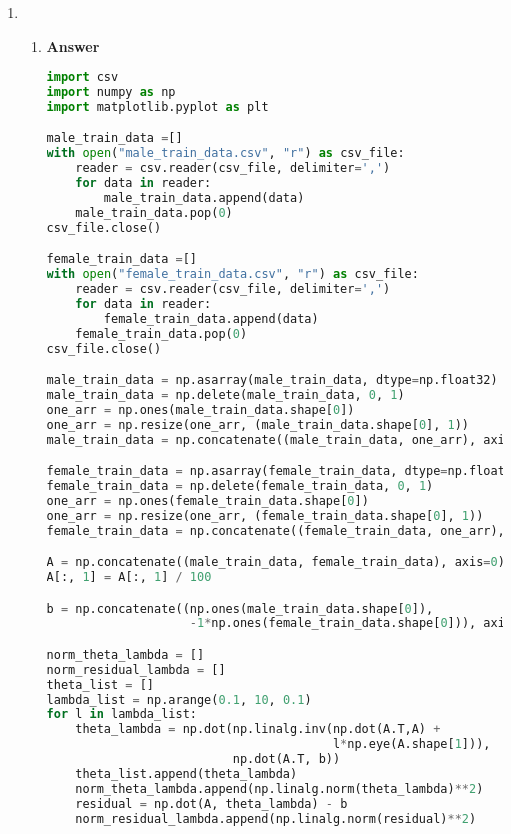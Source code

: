 \documentclass[11pt]{article}
\begin{document}
\begin{enumerate}[label=(\alph*)]

\item

\begin{enumerate}[label=(\roman*)]

\item \noindent\textbf{Answer}

\begin{lstlisting}[language=Python, showstringspaces=false]
import csv
import numpy as np
import matplotlib.pyplot as plt

male_train_data =[]
with open("male_train_data.csv", "r") as csv_file:
    reader = csv.reader(csv_file, delimiter=',')    
    for data in reader:
        male_train_data.append(data)        
    male_train_data.pop(0)   
csv_file.close()

female_train_data =[]
with open("female_train_data.csv", "r") as csv_file:    
    reader = csv.reader(csv_file, delimiter=',')    
    for data in reader:
        female_train_data.append(data)        
    female_train_data.pop(0)   
csv_file.close()

male_train_data = np.asarray(male_train_data, dtype=np.float32)
male_train_data = np.delete(male_train_data, 0, 1)
one_arr = np.ones(male_train_data.shape[0])
one_arr = np.resize(one_arr, (male_train_data.shape[0], 1))
male_train_data = np.concatenate((male_train_data, one_arr), axis=1)

female_train_data = np.asarray(female_train_data, dtype=np.float32)
female_train_data = np.delete(female_train_data, 0, 1)
one_arr = np.ones(female_train_data.shape[0])
one_arr = np.resize(one_arr, (female_train_data.shape[0], 1))
female_train_data = np.concatenate((female_train_data, one_arr), axis=1)

A = np.concatenate((male_train_data, female_train_data), axis=0)
A[:, 1] = A[:, 1] / 100

b = np.concatenate((np.ones(male_train_data.shape[0]), 
                    -1*np.ones(female_train_data.shape[0])), axis=0)

norm_theta_lambda = []
norm_residual_lambda = []
theta_list = []
lambda_list = np.arange(0.1, 10, 0.1)
for l in lambda_list:
    theta_lambda = np.dot(np.linalg.inv(np.dot(A.T,A) + 
                                        l*np.eye(A.shape[1])), 
                          np.dot(A.T, b))
    theta_list.append(theta_lambda)
    norm_theta_lambda.append(np.linalg.norm(theta_lambda)**2)
    residual = np.dot(A, theta_lambda) - b
    norm_residual_lambda.append(np.linalg.norm(residual)**2)
    

\end{lstlisting}
\end{enumerate}
\end{enumerate}
\end{document}
